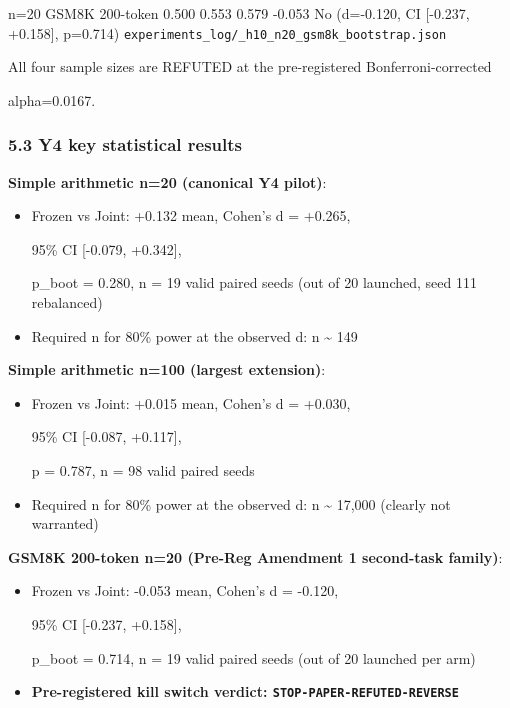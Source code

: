 \documentclass[11pt]{article}
\begin{document}
n=20 \textbar{} GSM8K 200-token \textbar{} 0.500 \textbar{} 0.553
\textbar{} 0.579 \textbar{} -0.053 \textbar{} No (d=-0.120, CI
{[}-0.237, +0.158{]}, p=0.714) \textbar{}
\texttt{experiments\_log/\_h10\_n20\_gsm8k\_bootstrap.json} \textbar{}

All four sample sizes are REFUTED at the pre-registered
Bonferroni-corrected

alpha=0.0167.

\subsubsection{5.3 Y4 key statistical
results}\label{y4-key-statistical-results}

\textbf{Simple arithmetic n=20 (canonical Y4 pilot)}:

\begin{itemize}
\item
  Frozen vs Joint: +0.132 mean, Cohen's d = +0.265,

  95\% CI {[}-0.079, +0.342{]},

  p\_boot = 0.280, n = 19 valid paired seeds (out of 20 launched, seed
  111 rebalanced)
\item
  Required n for 80\% power at the observed d: n \textasciitilde{} 149
\end{itemize}

\textbf{Simple arithmetic n=100 (largest extension)}:

\begin{itemize}
\item
  Frozen vs Joint: +0.015 mean, Cohen's d = +0.030,

  95\% CI {[}-0.087, +0.117{]},

  p = 0.787, n = 98 valid paired seeds
\item
  Required n for 80\% power at the observed d: n \textasciitilde{}
  17,000 (clearly not warranted)
\end{itemize}

\textbf{GSM8K 200-token n=20 (Pre-Reg Amendment 1 second-task family)}:

\begin{itemize}
\item
  Frozen vs Joint: -0.053 mean, Cohen's d = -0.120,

  95\% CI {[}-0.237, +0.158{]},

  p\_boot = 0.714, n = 19 valid paired seeds (out of 20 launched per
  arm)
\item
  \textbf{Pre-registered kill switch verdict:
  \texttt{STOP-PAPER-REFUTED-REVERSE}}
\end{itemize}
\end{document}
